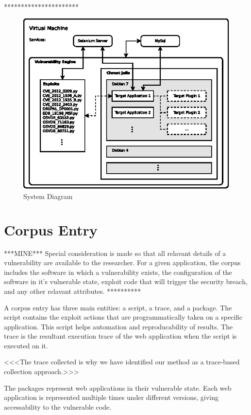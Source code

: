 \documentclass[letterpaper,twocolumn,10pt]{article}
\begin{document}
**********************
\begin{figure}[!tp]
\begin{center}
\includegraphics[scale=1.17]{system_diagram.eps}
\end{center}
\caption{System Diagram}
\end{figure}


\section{Corpus Entry}

***MINE***
Special consideration is made so that all relavant details of a vulnerability are available to the researcher. For a given application, the corpus includes the software in which a vulnerability exists, the configuration of the software in it's vulnerable state, exploit code that will trigger the security breach, and any other relavant attributes.
**********\par

A corpus entry has three main entities: a script, a trace, and a package.  The script contains the exploit actions that are programmatically taken on a specific application.  This script helps automation and reproducability of results.  The trace is the resultant execution trace of the web application when the script is executed on it.  

<<<The trace collected is why we have identified our method as a trace-based collection approach.>>>

  The packages represent web applications in their vulnerable state.  Each web application is represented multiple times under different versions, giving accessability to the vulnerable code.
\end{document}
